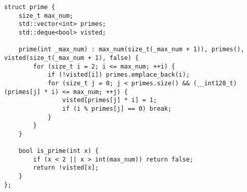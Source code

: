 \begin{lstlisting}
struct prime {
	size_t max_num;
	std::vector<int> primes;
	std::deque<bool> visted;
	
	prime(int _max_num) : max_num(size_t(_max_num + 1)), primes(), visted(size_t(_max_num + 1), false) {
		for (size_t i = 2; i <= max_num; ++i) {
			if (!visted[i]) primes.emplace_back(i);
			for (size_t j = 0; j < primes.size() && (__int128_t)(primes[j] * i) <= max_num; ++j) {
				visted[primes[j] * i] = 1;
				if (i % primes[j] == 0) break;
			}
		}
	}
	
	bool is_prime(int x) {
		if (x < 2 || x > int(max_num)) return false;
		return !visted[x];
	}
};
\end{lstlisting}